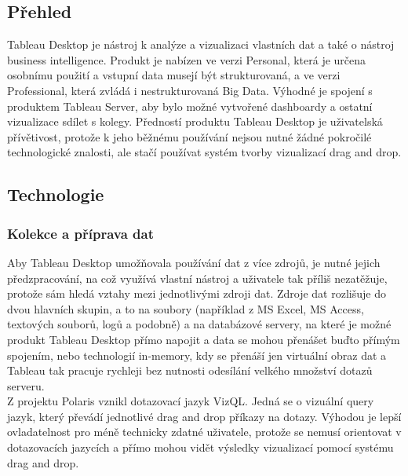 \documentclass[czech,BP]{thesiskiv}
\begin{document}
 \subsection{Přehled}
 Tableau Desktop je nástroj k analýze a vizualizaci vlastních dat a také o nástroj business intelligence. Produkt je nabízen ve verzi Personal, která je určena osobnímu použití a vstupní data musejí být strukturovaná, a ve verzi Professional, která zvládá i nestrukturovaná Big Data. Výhodné je spojení s produktem Tableau Server, aby bylo možné vytvořené dashboardy a ostatní vizualizace sdílet s kolegy. Předností produktu Tableau Desktop je uživatelská přívětivost, protože k jeho běžnému používání nejsou nutné žádné pokročilé technologické znalosti, ale stačí používat systém tvorby vizualizací drag and drop. 
 
 \subsection{Technologie}
 \subsubsection{Kolekce a příprava dat}
 Aby Tableau Desktop umožňovala používání dat z více zdrojů, je nutné jejich předzpracování, na což využívá vlastní nástroj a uživatele tak příliš nezatěžuje, protože sám hledá vztahy mezi jednotlivými zdroji dat. Zdroje dat rozlišuje do dvou hlavních skupin, a to na soubory (například z MS Excel, MS Access, textových souborů, logů a podobně) a na databázové servery, na které je možné produkt Tableau Desktop přímo napojit a data se mohou přenášet buďto přímým spojením, nebo technologií in-memory, kdy se přenáší jen virtuální obraz dat a Tableau tak pracuje rychleji bez nutnosti odesílání velkého množství dotazů serveru.
 \\
 Z projektu Polaris vznikl dotazovací jazyk VizQL\texttrademark. Jedná se o vizuální query jazyk, který převádí jednotlivé drag and drop příkazy na dotazy.\cite{VizQL} Výhodou je lepší ovladatelnost pro méně technicky zdatné uživatele, protože se nemusí orientovat v dotazovacích jazycích a přímo mohou vidět výsledky vizualizací pomocí systému drag and drop.
\end{document}
